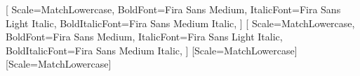 \usepackage{amsmath}
\usepackage{amssymb}
\usepackage{mathtools}

\usepackage{fontspec}
\usepackage{unicode-math}

\setsansfont{Fira Sans Light}[
	Scale=MatchLowercase,
	BoldFont=Fira Sans Medium,
	ItalicFont=Fira Sans Light Italic,
	BoldItalicFont=Fira Sans Medium Italic,
]
\setmainfont{Fira Sans Light}[
	Scale=MatchLowercase,
	BoldFont=Fira Sans Medium,
	ItalicFont=Fira Sans Light Italic,
	BoldItalicFont=Fira Sans Medium Italic,
]
\setmonofont{Fira Mono}[Scale=MatchLowercase]
[Scale=MatchLowercase]

\usepackage{microtype}

\usepackage[
	locale = US,
	per-mode = power,
	print-zero-exponent = true,
	print-unity-mantissa = false
]{siunitx}

